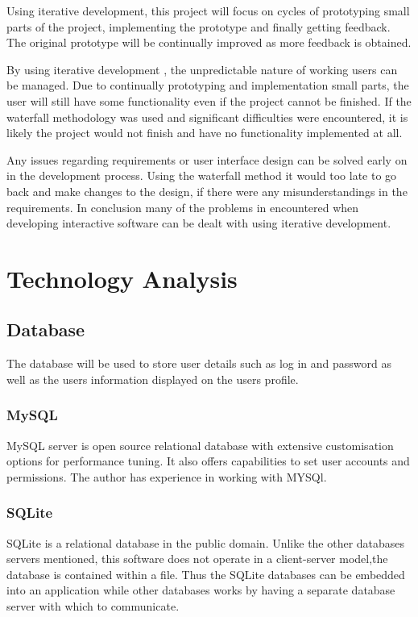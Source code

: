 \documentclass[a4paper,oneside,11pt]{report}
\begin{document}
Using iterative development, this project will focus on cycles of prototyping small parts of the project, implementing the prototype and finally getting feedback. The original prototype will be continually improved as more feedback is obtained.

By using iterative development , the unpredictable nature of working users can be managed. Due to continually prototyping and implementation small parts, the user will still have some functionality even if the project cannot be finished. If the waterfall methodology was used and significant difficulties were encountered, it is likely the project would not finish and have no functionality implemented at all. 

Any issues regarding requirements or user interface design can be solved early on in the development process. Using the waterfall method it would too late to go back and make changes to the design, if there were any misunderstandings in the requirements.
In conclusion many of the problems in encountered when developing interactive software can be dealt with using iterative development. 

\chapter{Technology Analysis}
\section{Database}
The database will be used to store user details such as log in and password as well as the users information displayed on the users profile.
\subsection{MySQL}
MySQL server is open source relational database with extensive customisation options for performance tuning. It also offers capabilities to set user accounts and permissions. The author has experience in working with MYSQl.
\subsection{SQLite}
SQLite is a relational database in the public domain. Unlike the other databases servers mentioned, this software does not operate in a client-server model,the database is contained within a file. Thus the SQLite databases can be embedded into an application while other databases works by having a separate database server with which to communicate.
\end{document}
